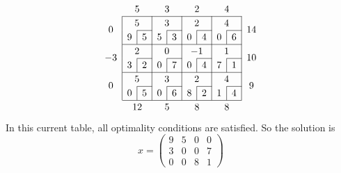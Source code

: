 \[
	\arraycolsep=5pt\def\arraystretch{1.2}
	\begin{array}{c|c|c|c|c|c|c|c|c|c}
		\multicolumn{1}{c}{}    & \multicolumn{2}{c}{5}  & \multicolumn{2}{c}{3}  & \multicolumn{2}{c}{2}   & \multicolumn{2}{c}{4}  & \multicolumn{1}{c}{}                                       \\\cline{2-9}
		\multirow{2}{*}{\(0\)}  & \multicolumn{2}{c|}{5} & \multicolumn{2}{c|}{3} & \multicolumn{2}{c|}{2}  & \multicolumn{2}{c|}{4} & \multirow{2}{*}{\(14\)}                                    \\\cline{3-3}\cline{5-5}\cline{7-7}\cline{9-9}
		                        & \multicolumn{1}{c|}{9} & 5                      & \multicolumn{1}{c|}{5}  & 3                      & \multicolumn{1}{c|}{0}  & 4 & \multicolumn{1}{c|}{0} & 6 & \\\cline{2-9}
		\multirow{2}{*}{\(-3\)} & \multicolumn{2}{c|}{2} & \multicolumn{2}{c|}{0} & \multicolumn{2}{c|}{-1} & \multicolumn{2}{c|}{1} & \multirow{2}{*}{\(10\)}                                    \\\cline{3-3}\cline{5-5}\cline{7-7}\cline{9-9}
		                        & \multicolumn{1}{c|}{3} & 2                      & \multicolumn{1}{c|}{0}  & 7                      & \multicolumn{1}{c|}{0}  & 4 & \multicolumn{1}{c|}{7} & 1 & \\\cline{2-9}
		\multirow{2}{*}{\(0\)}  & \multicolumn{2}{c|}{5} & \multicolumn{2}{c|}{3} & \multicolumn{2}{c|}{2}  & \multicolumn{2}{c|}{4} & \multirow{2}{*}{\(9\)}                                     \\\cline{3-3}\cline{5-5}\cline{7-7}\cline{9-9}
		                        & \multicolumn{1}{c|}{0} & 5                      & \multicolumn{1}{c|}{0}  & 6                      & \multicolumn{1}{c|}{8}  & 2 & \multicolumn{1}{c|}{1} & 4 & \\\cline{2-9}
		\multicolumn{1}{c}{}    & \multicolumn{2}{c}{12} & \multicolumn{2}{c}{5}  & \multicolumn{2}{c}{8}   & \multicolumn{2}{c}{8}  & \multicolumn{1}{c}{}
	\end{array}
\]
In this current table, all optimality conditions are satisfied.
So the solution is
\[
	x = \begin{pmatrix}
		9 & 5 & 0 & 0 \\
		3 & 0 & 0 & 7 \\
		0 & 0 & 8 & 1
	\end{pmatrix}
\]
